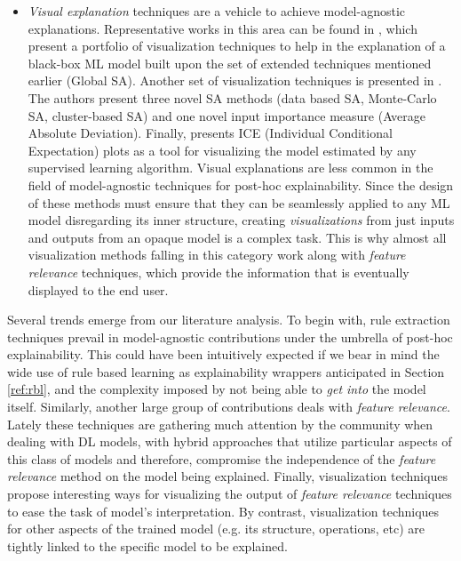 \documentclass[final]{elsarticle}
\begin{document}
\begin{itemize}[leftmargin=*]
	\item \textit{Visual explanation} techniques are a vehicle to achieve model-agnostic explanations. Representative works in this area can be found in \cite{SensitivityAnalysis}, which present a portfolio of visualization techniques to help in the explanation of a black-box ML model built upon the set of extended techniques mentioned earlier (Global SA). Another set of visualization techniques is presented in \cite{UsingSensitivityAndVisualization}. The authors present three novel SA methods (data based SA, Monte-Carlo SA, cluster-based SA) and one novel input importance measure (Average Absolute Deviation). Finally, \cite{VisualizingStatisticalLearning} presents ICE (Individual Conditional Expectation) plots as a tool for visualizing the model estimated by any supervised learning algorithm. Visual explanations are less common in the field of model-agnostic techniques for post-hoc explainability. Since the design of these methods must ensure that they can be seamlessly applied to any ML model disregarding its inner structure, creating \textit{visualizations} from just inputs and outputs from an opaque model is a complex task. This is why almost all visualization methods falling in this category work along with \textit{feature relevance} techniques, which provide the information that is eventually displayed to the end user.
\end{itemize}

Several trends emerge from our literature analysis. To begin with, rule extraction techniques prevail in model-agnostic contributions under the umbrella of post-hoc explainability. This could have been intuitively expected if we bear in mind the wide use of rule based learning as explainability wrappers anticipated in Section \ref{ref:rbl}, and the complexity imposed by not being able to \textit{get into} the model itself. Similarly, another large group of contributions deals with \textit{feature relevance}. Lately these techniques are gathering much attention by the community when dealing with DL models, with hybrid approaches that utilize particular aspects of this class of models and therefore, compromise the independence of the \textit{feature relevance} method on the model being explained. Finally, visualization techniques propose interesting ways for visualizing the output of \textit{feature relevance} techniques to ease the task of model's interpretation. By contrast, visualization techniques for other aspects of the trained model (e.g. its structure, operations, etc) are tightly linked to the specific model to be explained.
\end{document}
